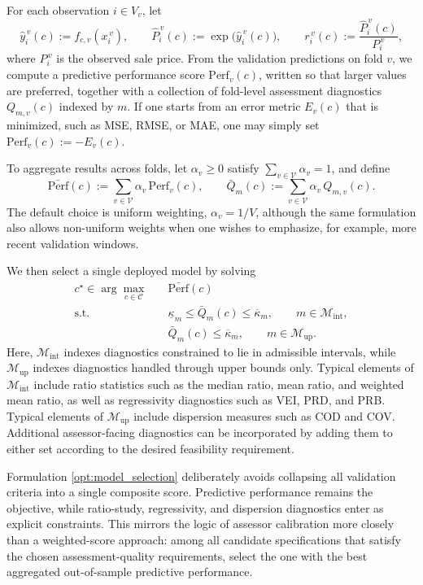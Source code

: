 \documentclass[12pt, draft]{article}
\theoremstyle{plain}
\theoremstyle{definition}
\newcommand{\1}{\mathbf{1}}
\begin{document}
For each observation $i\in V_v$, let
\[
\hat y_i^{\,v}(c):=f_{c,v}(x_i^{\,v}),
\qquad
\hat P_i^{\,v}(c):=\exp\!\bigl(\hat y_i^{\,v}(c)\bigr),
\qquad
r_i^{\,v}(c):=\frac{\hat P_i^{\,v}(c)}{P_i^{\,v}},
\]
where $P_i^{\,v}$ is the observed sale price. From the validation predictions on fold $v$, we compute a predictive performance score $\mathrm{Perf}_v(c)$, written so that larger values are preferred, together with a collection of fold-level assessment diagnostics $Q_{m,v}(c)$ indexed by $m$. If one starts from an error metric $E_v(c)$ that is minimized, such as MSE, RMSE, or MAE, one may simply set $\mathrm{Perf}_v(c):=-E_v(c)$.

To aggregate results across folds, let $\alpha_v\ge 0$ satisfy $\sum_{v\in\mathcal V}\alpha_v=1$, and define
\[
\bar{\mathrm{Perf}}(c):=\sum_{v\in\mathcal V}\alpha_v\,\mathrm{Perf}_v(c),
\qquad
\bar Q_m(c):=\sum_{v\in\mathcal V}\alpha_v\,Q_{m,v}(c).
\]
The default choice is uniform weighting, $\alpha_v=1/V$, although the same formulation also allows non-uniform weights when one wishes to emphasize, for example, more recent validation windows.

We then select a single deployed model by solving
\begin{align}
    \label{opt:model_selection}
    c^\star
    \in
    \arg\max_{c\in\mathcal C}
    \quad
    & \bar{\mathrm{Perf}}(c)
    \\
    \text{s.t.}\quad
    & \underline{\kappa}_m \le \bar Q_m(c) \le \overline{\kappa}_m,
    \qquad m\in\mathcal M_{\mathrm{int}},
    \nonumber\\
    & \bar Q_m(c) \le \overline{\kappa}_m,
    \qquad m\in\mathcal M_{\mathrm{up}}.
    \nonumber
\end{align}
Here, $\mathcal M_{\mathrm{int}}$ indexes diagnostics constrained to lie in admissible intervals, while $\mathcal M_{\mathrm{up}}$ indexes diagnostics handled through upper bounds only. Typical elements of $\mathcal M_{\mathrm{int}}$ include ratio statistics such as the median ratio, mean ratio, and weighted mean ratio, as well as regressivity diagnostics such as VEI, PRD, and PRB. Typical elements of $\mathcal M_{\mathrm{up}}$ include dispersion measures such as COD and COV. Additional assessor-facing diagnostics can be incorporated by adding them to either set according to the desired feasibility requirement.

Formulation \eqref{opt:model_selection} deliberately avoids collapsing all validation criteria into a single composite score. Predictive performance remains the objective, while ratio-study, regressivity, and dispersion diagnostics enter as explicit constraints. This mirrors the logic of assessor calibration more closely than a weighted-score approach: among all candidate specifications that satisfy the chosen assessment-quality requirements, select the one with the best aggregated out-of-sample predictive performance.
\end{document}
